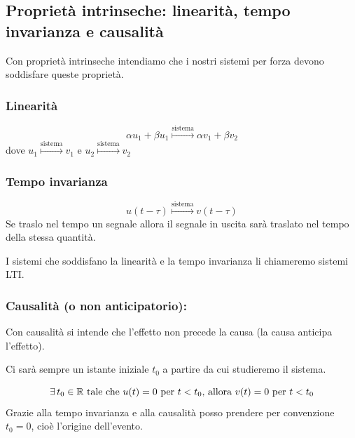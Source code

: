 	\subsection{Proprietà intrinseche: linearità, tempo invarianza e causalità}
	Con proprietà intrinseche intendiamo che i nostri sistemi per forza devono soddisfare queste proprietà.
		
		\subsubsection{Linearità}\label{sist_prop_Lin} 
			\[
			\alpha u_1+\beta u_1 \overset{\text{sistema}}{\longmapsto} \alpha v_1+\beta v_2
			\]
			dove $ u_1 \overset{\text{sistema}}{\longmapsto} v_1$ e $u_2\overset{\text{sistema}}{\longmapsto} v_2$
			
		\subsubsection{Tempo invarianza} \label{sist_prop_TIn}
			\[
			u(t-\tau) \overset{\text{sistema}}{\longmapsto} v(t-\tau)
			\]
			Se traslo nel tempo un segnale allora il segnale in uscita sarà traslato nel tempo della stessa quantità.
			
			\begin{definizione}
				I sistemi che soddisfano la linearità e la tempo invarianza li chiameremo sistemi LTI.
			\end{definizione}
		
		\subsubsection{Causalità (o non anticipatorio):} \label{sist_prop_cau}
			
			Con causalità si intende che l'effetto non precede la causa (la causa anticipa l'effetto).
			
			\begin{osservazione}
				Ci sarà sempre un istante iniziale $t_0$ a partire da cui studieremo il sistema.
			\end{osservazione}
		
			\[
				\exists \,t_0 \in \mathbb{R} \text{ tale che } u(t)=0 \text{ per } t<t_0
				\text{, allora } v(t)=0 \text{ per } t<t_0
			\]		
			Grazie alla tempo invarianza e alla causalità posso prendere per convenzione $ t_0 = 0$, cioè l'origine dell'evento.
			
